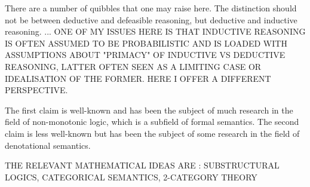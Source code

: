 \documentclass[a4paper,11pt]{report}
\begin{document}
There are a number of quibbles that one may raise here. The distinction should not be between deductive and defeasible reasoning, but deductive and inductive reasoning. ... ONE OF MY ISSUES HERE IS THAT INDUCTIVE REASONING IS OFTEN ASSUMED TO BE PROBABILISTIC AND IS LOADED WITH ASSUMPTIONS ABOUT "PRIMACY" OF INDUCTIVE VS DEDUCTIVE REASONING, LATTER OFTEN SEEN AS A LIMITING CASE OR IDEALISATION OF THE FORMER. HERE I OFFER A DIFFERENT PERSPECTIVE.



The first claim is well-known and has been the subject of much research in the field of non-monotonic logic, which is a subfield of formal semantics. The second claim is less well-known but has been the subject of some research in the field of denotational semantics.

THE RELEVANT MATHEMATICAL IDEAS ARE : SUBSTRUCTURAL LOGICS, CATEGORICAL SEMANTICS, 2-CATEGORY THEORY
\end{document}
